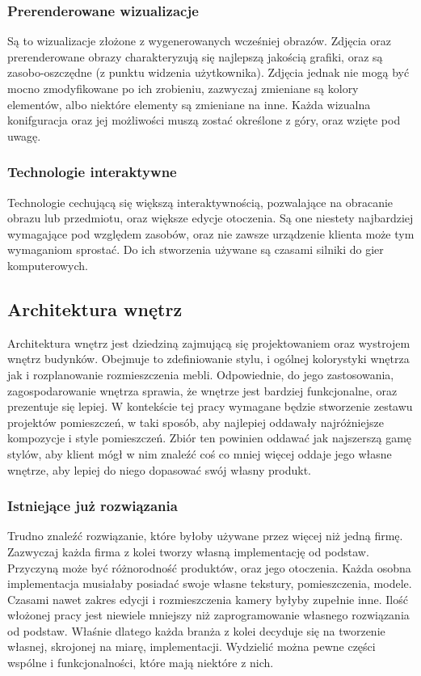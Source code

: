 \documentclass{article} %
\begin{document}
        \subsubsection*{Prerenderowane wizualizacje}
        Są to wizualizacje złożone z wygenerowanych wcześniej obrazów. Zdjęcia oraz prerenderowane obrazy charakteryzują się najlepszą jakością grafiki, oraz są zasobo-oszczędne (z punktu widzenia użytkownika). Zdjęcia jednak nie mogą być mocno zmodyfikowane po ich zrobieniu, zazwyczaj zmieniane są kolory elementów, albo niektóre elementy są zmieniane na inne. Każda wizualna konifguracja oraz jej możliwości muszą zostać określone z góry, oraz wzięte pod uwagę. 
        \\
        
        \subsubsection*{Technologie interaktywne}
        Technologie cechującą się większą interaktywnością, pozwalające na obracanie obrazu lub przedmiotu, oraz większe edycje otoczenia. Są one niestety najbardziej wymagające pod względem zasobów, oraz nie zawsze urządzenie klienta może tym wymaganiom sprostać. Do ich stworzenia używane są czasami silniki do gier komputerowych.
        \\
    
    \subsection{Architektura wnętrz}
        Architektura wnętrz jest dziedziną zajmującą się projektowaniem oraz wystrojem wnętrz budynków. Obejmuje to zdefiniowanie stylu, i ogólnej kolorystyki wnętrza jak i rozplanowanie rozmieszczenia mebli. Odpowiednie, do jego zastosowania, zagospodarowanie wnętrza sprawia, że wnętrze jest bardziej funkcjonalne, oraz prezentuje się lepiej. W kontekście tej pracy wymagane będzie stworzenie zestawu projektów pomieszczeń, w taki sposób, aby najlepiej oddawały najróżniejsze kompozycje i style pomieszczeń. Zbiór ten powinien oddawać jak najszerszą gamę stylów, aby klient mógł w nim znaleźć coś co mniej więcej oddaje jego własne wnętrze, aby lepiej do niego dopasować swój własny produkt.
        \\
        
        \subsubsection{Istniejące już rozwiązania}
        Trudno znaleźć rozwiązanie, które byłoby używane przez więcej niż jedną firmę. Zazwyczaj każda firma z kolei tworzy własną implementację od podstaw. Przyczyną może być różnorodność produktów, oraz jego otoczenia. Każda osobna implementacja musiałaby posiadać swoje własne tekstury, pomieszczenia, modele. Czasami nawet zakres edycji i rozmieszczenia kamery byłyby zupełnie inne. Ilość włożonej pracy jest niewiele mniejszy niż zaprogramowanie własnego rozwiązania od podstaw. Właśnie dlatego każda branża z kolei decyduje się na tworzenie własnej, skrojonej na miarę, implementacji. Wydzielić można pewne części wspólne i funkcjonalności, które mają niektóre z nich. 
        \\
        
\end{document}
